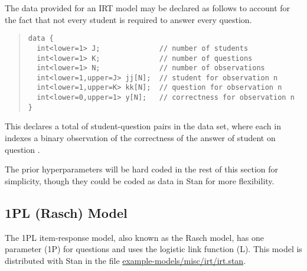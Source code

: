 The data provided for an IRT model may be declared as follows
to account for the fact that not every student is required to answer
every question.
%
\begin{quote}
\begin{Verbatim}[fontsize=\small]
data {
  int<lower=1> J;              // number of students
  int<lower=1> K;              // number of questions
  int<lower=1> N;              // number of observations
  int<lower=1,upper=J> jj[N];  // student for observation n
  int<lower=1,upper=K> kk[N];  // question for observation n
  int<lower=0,upper=1> y[N];   // correctness for observation n
}
\end{Verbatim}
\end{quote}
%
This declares a total of  student-question pairs in the data
set, where each  in  indexes a binary observation
 of the correctness of the answer of student 
on question .

The prior hyperparameters will be hard coded in the rest of this
section for simplicity, though they could be coded as data in
Stan for more flexibility.

\subsection{1PL (Rasch) Model}

The 1PL item-response model, also known as the Rasch model, has one
parameter (1P) for questions and uses the logistic link function (L).
This model is distributed with Stan in the file
\url{example-models/misc/irt/irt.stan}.

